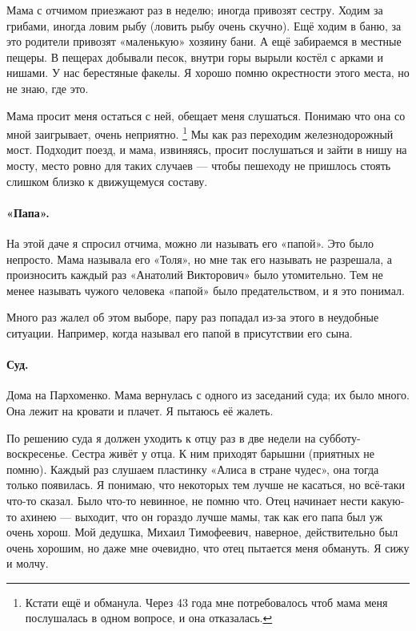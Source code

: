 \documentclass{book}
\begin{document}
Мама с отчимом приезжают раз в неделю; иногда привозят сестру.
Ходим за грибами, иногда ловим рыбу (ловить рыбу очень скучно).
Ещё ходим в баню, за это родители привозят «маленькую» хозяину бани.
А ещё забираемся в местные пещеры.
В пещерах добывали песок, внутри горы вырыли костёл с арками и нишами.
У нас берестяные факелы.
Я хорошо помню окрестности этого места, но не знаю, где это.

Мама просит меня остаться с ней, обещает меня слушаться.
Понимаю что она со мной заигрывает, очень неприятно.%
\footnote{Кстати ещё и обманула.
Через 43 года мне потребовалось чтоб мама меня послушалась в одном вопросе, и она отказалась.}
Мы как раз переходим железнодорожный мост.
Подходит поезд, и мама, извиняясь, просит послушаться и зайти в нишу на мосту,
место ровно для таких случаев --- чтобы пешеходу не пришлось стоять слишком близко к движущемуся составу.

\paragraph{«Папа».}
На этой даче я спросил отчима, можно ли называть его «папой».
Это было непросто.
Мама называла его «Толя», но мне так его называть не разрешала, а произносить каждый раз «Анатолий Викторович» было утомительно.
Тем не менее называть чужого человека «папой» было предательством, и я это понимал.

Много раз жалел об этом выборе, пару раз попадал из-за этого в неудобные ситуации.
Например, когда называл его папой в присутствии его сына.

\paragraph{Суд.}
Дома на Пархоменко.
Мама вернулась с одного из заседаний суда;
их было много.
Она лежит на кровати и плачет.
Я пытаюсь её жалеть.

По решению суда я должен уходить к отцу раз в две недели на субботу-воскресенье.
Сестра живёт у отца.
К ним приходят барышни (приятных не помню).
Каждый раз слушаем пластинку «Алиса в стране чудес»,
она тогда только появилась.
Я понимаю, что некоторых тем лучше не касаться,
но всё-таки что-то сказал.
Было что-то невинное, не помню что.
Отец начинает нести какую-то ахинею ---
выходит, что он гораздо лучше мамы,
так как его папа был уж очень хорош.
Мой дедушка, Михаил Тимофеевич, наверное, действительно был очень хорошим,
но даже мне очевидно, что отец пытается меня обмануть.
Я сижу и молчу.
\end{document}
